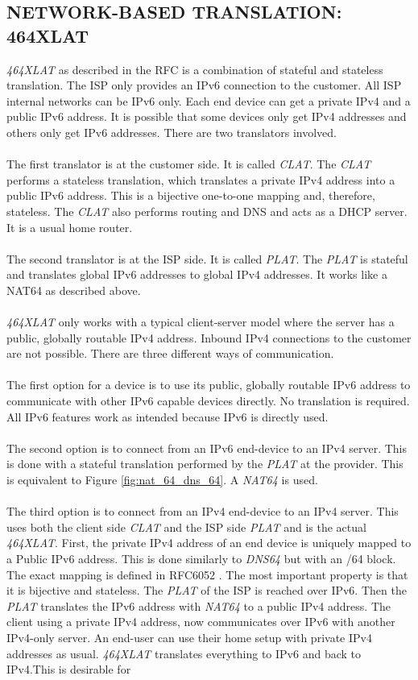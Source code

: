 \documentclass[format=sigconf, natbib=true, nonacm=true]{acmart}
\begin{document}
    \subsection{NETWORK-BASED TRANSLATION: 464XLAT}
    \textit{464XLAT} as described in the RFC \cite{rfc6877} is a combination of stateful and stateless translation. The ISP only provides an IPv6 connection to the customer. All ISP internal networks can be IPv6 only. Each end device can get a private IPv4 and a public IPv6 address. It is possible that some devices only get IPv4 addresses and others only get IPv6 addresses. There are two translators involved.\\\\The first translator is at the customer side. It is called \textit{CLAT}. The \textit{CLAT} performs a stateless translation, which translates a private IPv4 address into a public IPv6 address. This is a bijective one-to-one mapping and, therefore, stateless. The \textit{CLAT} also performs routing and DNS and acts as a DHCP server. It is a usual home router.\\\\The second translator is at the ISP side. It is called \textit{PLAT}. The \textit{PLAT} is stateful and translates global IPv6 addresses to global IPv4 addresses. It works like a NAT64 as described above.\\\\\textit{464XLAT} only works with a typical client-server model where the server has a public, globally routable IPv4 address. Inbound IPv4 connections to the customer are not possible. There are three different ways of communication.\\\\The first option for a device is to use its public, globally routable IPv6 address to communicate with other IPv6 capable devices directly. No translation is required. All IPv6 features work as intended because IPv6 is directly used.\\\\The second option is to connect from an IPv6 end-device to an IPv4 server. This is done with a stateful translation performed by the \textit{PLAT} at the provider. This is equivalent to Figure \ref{fig:nat_64_dns_64}. A \textit{NAT64} is used.\\\\The third option is to connect from an IPv4 end-device to an IPv4 server. This uses both the client side \textit{CLAT} and the ISP side \textit{PLAT} and is the actual \textit{464XLAT}. First, the private IPv4 address of an end device is uniquely mapped to a Public IPv6 address. This is done similarly to \textit{DNS64} but with an /64 block. The exact mapping is defined in RFC6052 \cite{rfc6052}. The most important property is that it is bijective and stateless. The \textit{PLAT} of the ISP is reached over IPv6. Then the \textit{PLAT} translates the IPv6 address with \textit{NAT64} to a public IPv4 address. The client using a private IPv4 address, now communicates over IPv6 with another IPv4-only server. An end-user can use their home setup with private IPv4 addresses as usual. \textit{464XLAT} translates everything to IPv6 and back to IPv4.This is desirable for 
\end{document}

